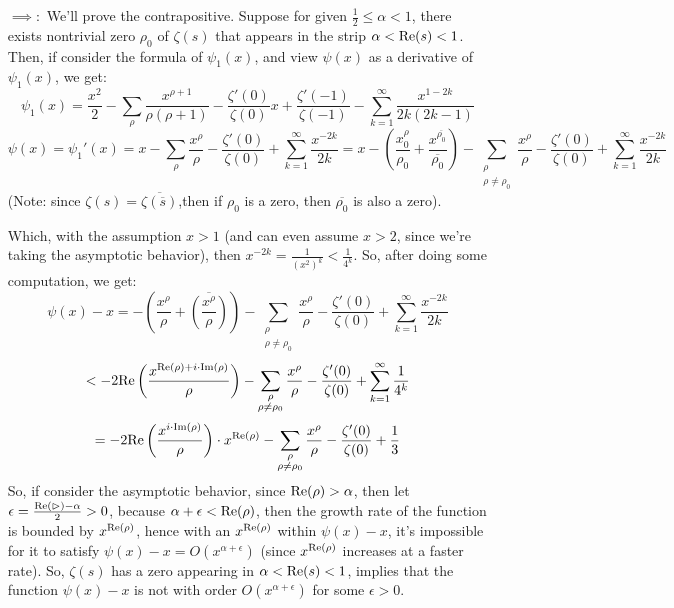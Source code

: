 \documentclass{article}
\begin{document}
\begin{itemize}
    \item[$\implies:$] We'll prove the contrapositive. Suppose for given $\frac{1}{2}\leq \alpha<1$, there exists nontrivial zero $\rho_0$ of $\zeta(s)$ that appears in the strip $\alpha<\textmd{Re}(s)<1$. Then, if consider the formula of $\psi_1(x)$, and view $\psi(x)$ as a derivative of $\psi_1(x)$, we get:
    $$\psi_1(x)=\frac{x^2}{2}-\sum_{\rho}\frac{x^{\rho+1}}{\rho(\rho+1)}-\frac{\zeta'(0)}{\zeta(0)}x+\frac{\zeta'(-1)}{\zeta(-1)}-\sum_{k=1}^{\infty}\frac{x^{1-2k}}{2k(2k-1)}$$
    $$\psi(x)=\psi_1'(x)=x-\sum_{\rho}\frac{x^\rho}{\rho}-\frac{\zeta'(0)}{\zeta(0)}+\sum_{k=1}^{\infty}\frac{x^{-2k}}{2k} =x-\left(\frac{x^\rho_0}{\rho_0}+\frac{x^{\overline{\rho_0}}}{\overline{\rho_0}}\right)-\sum_{\substack{\rho\\\rho\neq \rho_0}}\frac{x^\rho}{\rho}-\frac{\zeta'(0)}{\zeta(0)}+\sum_{k=1}^{\infty}\frac{x^{-2k}}{2k}$$
    (Note: since $\zeta(s)=\overline{\zeta(\overline{s})}$,then if $\rho_0$ is a zero, then $\overline{\rho_0}$ is also a zero).

    Which, with the assumption $x>1$ (and can even assume $x>2$, since we're taking the asymptotic behavior), then $x^{-2k} = \frac{1}{(x^2)^k} < \frac{1}{4^k}$. So, after doing some computation, we get:
    $$\psi(x)-x = -\left(\frac{x^\rho}{\rho}+\overline{\left(\frac{x^\rho}{\rho}\right)}\right)-\sum_{\substack{\rho\\\rho\neq \rho_0}}\frac{x^\rho}{\rho}-\frac{\zeta'(0)}{\zeta(0)}+\sum_{k=1}^{\infty}\frac{x^{-2k}}{2k}$$
    $$ < -2\textmd{Re}\left(\frac{x^{\textmd{Re}(\rho)+i\cdot
    \textmd{Im}(\rho)}}{\rho}\right)-\sum_{\substack{\rho\\\rho\neq \rho_0}}\frac{x^\rho}{\rho}-\frac{\zeta'(0)}{\zeta(0)} + \sum_{k=1}^{\infty}\frac{1}{4^k}$$
    $$ = -2\textmd{Re}\left(\frac{x^{i\cdot \textmd{Im}(\rho)}}{\rho}\right)\cdot x^{\textmd{Re}(\rho)} -\sum_{\substack{\rho\\\rho\neq \rho_0}}\frac{x^\rho}{\rho}-\frac{\zeta'(0)}{\zeta(0)} + \frac{1}{3}$$
    So, if consider the asymptotic behavior, since $\textmd{Re}(\rho)>\alpha$, then let $\epsilon=\frac{\textmd{Re}(\rhd)-\alpha}{2}>0$, because $\alpha + \epsilon < \textmd{Re}(\rho)$, then the growth rate of the function is bounded by $x^{\textmd{Re}(\rho)}$, hence with an $x^{\textmd{Re}(\rho)}$ within $\psi(x)-x$, it's impossible for it to satisfy $\psi(x)-x=O(x^{\alpha+\epsilon})$ (since $x^{\textmd{Re}(\rho)}$ increases at a faster rate).
    So, $\zeta(s)$ has a zero appearing in $\alpha<\textmd{Re}(s)<1$, implies that the function $\psi(x)-x$ is not with order $O(x^{\alpha+\epsilon})$ for some $\epsilon>0$.


\end{itemize}
\end{document}
